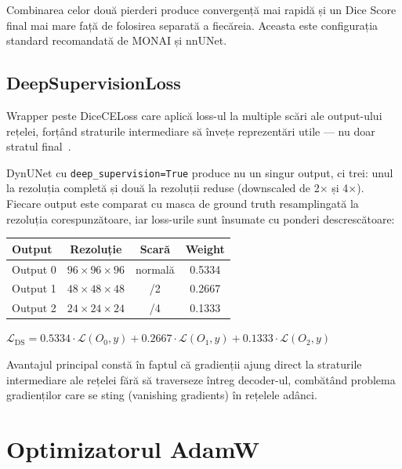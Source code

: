 \documentclass[12pt, a4paper]{report}
\newcommand{\formula}[1]{%
    \begin{center}
        \colorbox{codebackground}{%
            \parbox{0.88\textwidth}{\centering\vspace{4pt}$#1$\vspace{4pt}}%
        }
    \end{center}
}
\begin{document}
\begin{goodbox}
Combinarea celor două pierderi produce convergență mai rapidă și un
Dice Score final mai mare față de folosirea separată a fiecăreia.
Aceasta este configurația standard recomandată de MONAI și nnUNet.
\end{goodbox}

\subsection{DeepSupervisionLoss}
\label{sec:deepsupervision}

\vspace{4pt}
\begin{infobox}
Wrapper peste DiceCELoss care aplică loss-ul la multiple scări ale
output-ului rețelei, forțând straturile intermediare să învețe
reprezentări utile — nu doar stratul final~\cite{isensee2019automated}.
\end{infobox}

DynUNet cu \texttt{deep\_supervision=True} produce nu un singur output,
ci trei: unul la rezoluția completă și două la rezoluții reduse (downscaled de 2× și 4×).
Fiecare output este comparat cu masca de ground truth resamplingată la rezoluția corespunzătoare,
iar loss-urile sunt însumate cu ponderi descrescătoare:

\begin{center}
\begin{tabular}{lccc}
    \toprule
    \textbf{Output} & \textbf{Rezoluție} & \textbf{Scară} & \textbf{Weight} \\
    \midrule
    Output 0 & $96\times96\times96$  & normală & 0.5334 \\
    Output 1 & $48\times48\times48$  & /2      & 0.2667 \\
    Output 2 & $24\times24\times24$  & /4      & 0.1333 \\
    \bottomrule
\end{tabular}
\end{center}

\formula{
    \mathcal{L}_{\text{DS}} =
    0.5334 \cdot \mathcal{L}(O_0, y)
    + 0.2667 \cdot \mathcal{L}(O_1, y)
    + 0.1333 \cdot \mathcal{L}(O_2, y)
}

Avantajul principal constă în faptul că gradienții ajung direct la straturile intermediare
ale rețelei fără să traverseze întreg decoder-ul, combătând problema gradienților care se
sting (vanishing gradients) în rețelele adânci.

\section{Optimizatorul AdamW}
\label{sec:adamw}
\end{document}
